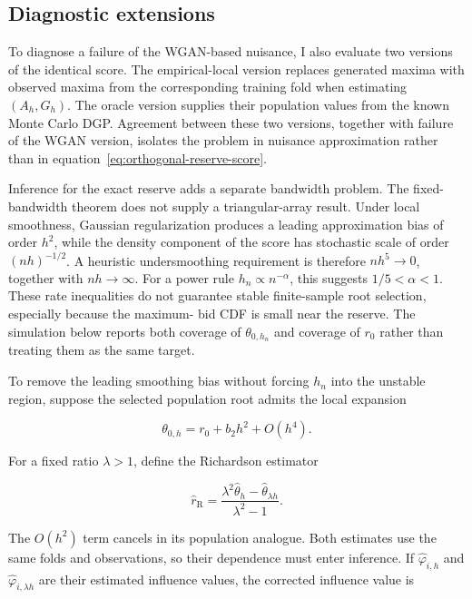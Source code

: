 \subsection{Diagnostic extensions}

To diagnose a failure of the WGAN-based nuisance, I also evaluate two versions
of the identical score. The empirical-local version replaces generated maxima
with observed maxima from the corresponding training fold when estimating
$(A_h,G_h)$. The oracle version supplies their population values from the known
Monte Carlo DGP. Agreement between these two versions, together with failure of
the WGAN version, isolates the problem in nuisance approximation rather than in
equation~\eqref{eq:orthogonal-reserve-score}.

Inference for the exact reserve adds a separate bandwidth problem. The
fixed-bandwidth theorem does not supply a triangular-array result. Under local
smoothness, Gaussian regularization produces a leading approximation bias of
order $h^2$, while the density component of the score has stochastic scale of
order $(nh)^{-1/2}$. A heuristic undersmoothing requirement is therefore
$nh^5\to0$, together with $nh\to\infty$. For a power rule $h_n\propto
n^{-\alpha}$, this suggests $1/5<\alpha<1$. These rate inequalities do not
guarantee stable finite-sample root selection, especially because the maximum-
bid CDF is small near the reserve. The simulation below reports both coverage
of $\theta_{0,h_n}$ and coverage of $r_0$ rather than treating them as the same
target.

To remove the leading smoothing bias without forcing $h_n$ into the unstable
region, suppose the selected population root admits the local expansion

\begin{equation}
\theta_{0,h}=r_0+b_2h^2+O(h^4).
\end{equation}

For a fixed ratio $\lambda>1$, define the Richardson estimator

\begin{equation}
\widehat r_{\mathrm R}
=\frac{\lambda^2\widehat\theta_h-
\widehat\theta_{\lambda h}}{\lambda^2-1}.
\label{eq:richardson-reserve}
\end{equation}

The $O(h^2)$ term cancels in its population analogue. Both estimates use the
same folds and observations, so their dependence must enter inference. If
$\widehat\varphi_{i,h}$ and $\widehat\varphi_{i,\lambda h}$ are their estimated
influence values, the corrected influence value is

